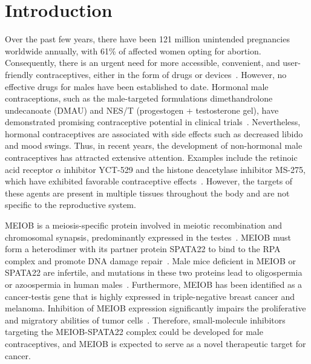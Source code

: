 \documentclass[unnumsec,webpdf,contemporary,large]{oup-authoring-template}%
\theoremstyle{thmstyleone}%
\theoremstyle{thmstyletwo}%
\theoremstyle{thmstylethree}%
\begin{document}
\maketitle



\section{Introduction}

Over the past few years, there have been 121 million unintended pregnancies worldwide annually, with 61\% of affected women opting for abortion. Consequently, there is an urgent need for more accessible, convenient, and user-friendly contraceptives, either in the form of drugs or devices~\cite{1}. However, no effective drugs for males have been established to date. Hormonal male contraceptions, such as the male-targeted formulations dimethandrolone undecanoate (DMAU) and NES/T (progestogen + testosterone gel), have demonstrated promising contraceptive potential in clinical trials~\cite{2,3}. Nevertheless, hormonal contraceptives are associated with side effects such as decreased libido and mood swings. Thus, in recent years, the development of non-hormonal male contraceptives has attracted extensive attention. Examples include the retinoic acid receptor $\alpha$ inhibitor YCT-529 and the histone deacetylase inhibitor MS-275, which have exhibited favorable contraceptive effects~\cite{4,5}. However, the targets of these agents are present in multiple tissues throughout the body and are not specific to the reproductive system.

MEIOB is a meiosis-specific protein involved in meiotic recombination and chromosomal synapsis, predominantly expressed in the testes~\cite{6,7}. MEIOB must form a heterodimer with its partner protein SPATA22 to bind to the RPA complex and promote DNA damage repair~\cite{8,9,10,11}. Male mice deficient in MEIOB or SPATA22 are infertile, and mutations in these two proteins lead to oligospermia or azoospermia in human males~\cite{12,13,14,15,16,17}. Furthermore, MEIOB has been identified as a cancer-testis gene that is highly expressed in triple-negative breast cancer and melanoma. Inhibition of MEIOB expression significantly impairs the proliferative and migratory abilities of tumor cells~\cite{18,19,20}. Therefore, small-molecule inhibitors targeting the MEIOB-SPATA22 complex could be developed for male contraceptives, and MEIOB is expected to serve as a novel therapeutic target for cancer.
\end{document}
